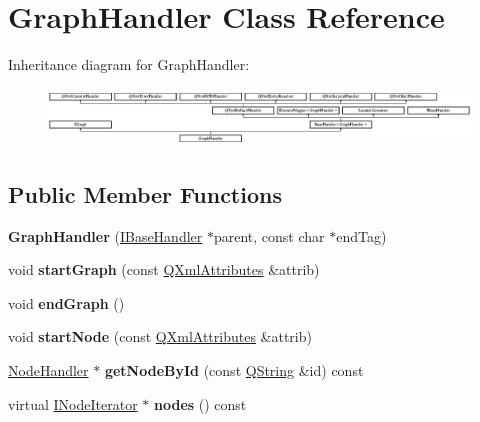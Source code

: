 \hypertarget{class_graph_handler}{}\section{Graph\+Handler Class Reference}
\label{class_graph_handler}
Inheritance diagram for Graph\+Handler\+:\begin{figure}[H]
\begin{center}
\leavevmode
\includegraphics[height=1.509434cm]{class_graph_handler}
\end{center}
\end{figure}
\subsection*{Public Member Functions}
\begin{DoxyCompactItemize}
\item 
\mbox{\label{class_graph_handler_a51f06fa9225e0f5d074972db4b063d2d}} 
{\bfseries Graph\+Handler} (\mbox{\hyperlink{class_i_base_handler}{I\+Base\+Handler}} $\ast$parent, const char $\ast$end\+Tag)
\item 
\mbox{\label{class_graph_handler_a5da61c7fea27c41f6bf6bd793a72ae1c}} 
void {\bfseries start\+Graph} (const \mbox{\hyperlink{class_q_xml_attributes}{Q\+Xml\+Attributes}} \&attrib)
\item 
\mbox{\label{class_graph_handler_a6485764ae40328b3f94b49ab43293287}} 
void {\bfseries end\+Graph} ()
\item 
\mbox{\label{class_graph_handler_a681595998c8b91270b3522456cfca6c8}} 
void {\bfseries start\+Node} (const \mbox{\hyperlink{class_q_xml_attributes}{Q\+Xml\+Attributes}} \&attrib)
\item 
\mbox{\label{class_graph_handler_af52c406a013f8d422eac4cfd02ee7cf9}} 
\mbox{\hyperlink{class_node_handler}{Node\+Handler}} $\ast$ {\bfseries get\+Node\+By\+Id} (const \mbox{\hyperlink{class_q_string}{Q\+String}} \&id) const
\item 
\mbox{\label{class_graph_handler_a86dadca38e98d1975cd9d6295db76bbf}} 
virtual \mbox{\hyperlink{class_i_node_iterator}{I\+Node\+Iterator}} $\ast$ {\bfseries nodes} () const
\end{DoxyCompactItemize}
